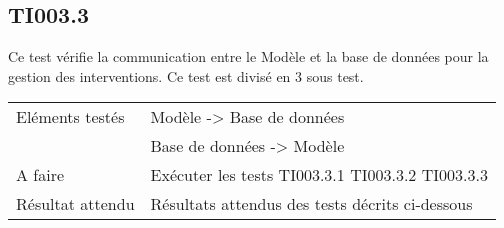 
\subsection{TI003.3}
  		Ce test vérifie la communication entre le Modèle et la base de données pour la gestion des interventions. Ce test est divisé en 3 sous test.
  	
 
 	 \begin{center}
    	 	\begin{tabular}[h]{|p{}|p{}|}
		\hline
			Eléments testés & Modèle -> Base de données  \\
						    &  Base de données -> Modèle \\\hline
    			A faire & Exécuter les tests TI003.3.1 TI003.3.2 TI003.3.3 \\\hline
    			Résultat attendu & Résultats attendus des tests décrits ci-dessous \\\hline
     	\end{tabular}
  	\end{center}	
  	

  		




  		
  		

